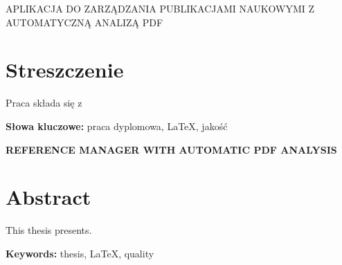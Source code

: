\newpage
\begin{center}
\large \bf

APLIKACJA DO ZARZĄDZANIA PUBLIKACJAMI NAUKOWYMI Z AUTOMATYCZNĄ ANALIZĄ PDF
\end{center}

\section*{Streszczenie}
Praca składa się z 

\bigskip
{\noindent\bf Słowa kluczowe:} praca dyplomowa, LaTeX, jakość

\vskip 2cm


\begin{center}
\large \bf
\uppercase{Reference manager with automatic PDF analysis}
\end{center}

\section*{Abstract}
This thesis presents.

\bigskip
{\noindent\bf Keywords:} thesis, LaTeX, quality

\vfill